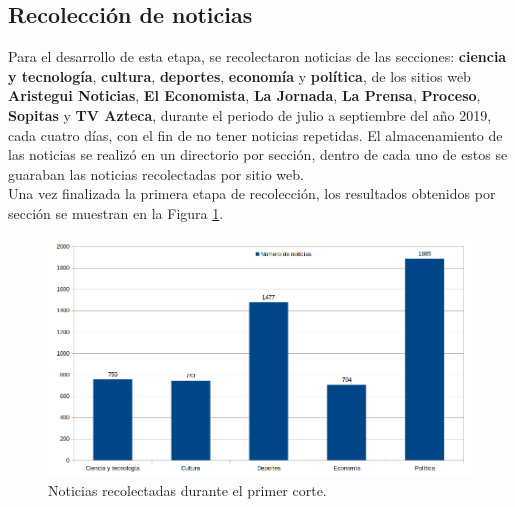 \begin{table}[H]
\centering
{}
\caption{Ejemplo de estructura de un archivo CSV}
\label{tab:csv}
\end{table}

\subsection{Recolección de noticias}

Para el desarrollo de esta etapa, se recolectaron noticias de las secciones: \textbf{ciencia y tecnología}, \textbf{cultura}, \textbf{deportes}, \textbf{economía} y \textbf{política}, de los sitios web \textbf{Aristegui Noticias}, \textbf{El Economista}, \textbf{La Jornada}, \textbf{La Prensa}, \textbf{Proceso}, \textbf{Sopitas} y \textbf{TV Azteca}, durante el periodo de julio a septiembre del año 2019, cada cuatro días, con el fin de no tener noticias repetidas. El almacenamiento de las noticias se realizó en un directorio por sección, dentro de cada uno de estos se guaraban las noticias recolectadas por sitio web.\\

Una vez finalizada la primera etapa de recolección, los resultados obtenidos por sección se muestran en la Figura  \ref{Fig:notseccionV1}.
\begin{figure}[H]
	\centering
	\includegraphics[scale=.4]{imagenes/Capitulo5/noticiasPorSeccionV1.png}
	\caption{Noticias recolectadas durante el primer corte.}
	\label{Fig:notseccionV1}
\end{figure}

